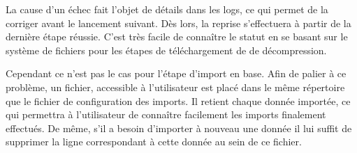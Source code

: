 La cause d'un échec fait l'objet de détails dans les logs, ce qui permet de la corriger avant le lancement suivant. Dès lors, la reprise s'effectuera à partir de la dernière étape réussie. C'est très facile de connaître le statut en se basant sur le système de fichiers pour les étapes de téléchargement de de décompression.

Cependant ce n'est pas le cas pour l'étape d'import en base. Afin de palier à ce problème, un fichier, accessible à l'utilisateur est placé dans le même répertoire que le fichier de configuration des imports. Il retient chaque donnée importée, ce qui permettra à l'utilisateur de connaître facilement les imports finalement effectués. De même, s'il a besoin d'importer à nouveau une donnée il lui suffit de supprimer la ligne correspondant à cette donnée au sein de ce fichier.
